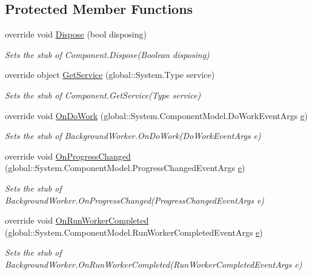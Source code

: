\subsection*{Protected Member Functions}
\begin{DoxyCompactItemize}
\item 
override void \hyperlink{class_system_1_1_component_model_1_1_fakes_1_1_stub_background_worker_a59437b38c520f4b2170ad1131b63957f}{Dispose} (bool disposing)
\begin{DoxyCompactList}\small\item\em Sets the stub of Component.\-Dispose(\-Boolean disposing)\end{DoxyCompactList}\item 
override object \hyperlink{class_system_1_1_component_model_1_1_fakes_1_1_stub_background_worker_a7fcca03bb90f1d559943e375f530c9d4}{Get\-Service} (global\-::\-System.\-Type service)
\begin{DoxyCompactList}\small\item\em Sets the stub of Component.\-Get\-Service(\-Type service)\end{DoxyCompactList}\item 
override void \hyperlink{class_system_1_1_component_model_1_1_fakes_1_1_stub_background_worker_adcdbb4b3f6e42ad2f9a6c024bc51e2e7}{On\-Do\-Work} (global\-::\-System.\-Component\-Model.\-Do\-Work\-Event\-Args \hyperlink{jquery-1_810_82_8min_8js_a2c038346d47955cbe2cb91e338edd7e1}{e})
\begin{DoxyCompactList}\small\item\em Sets the stub of Background\-Worker.\-On\-Do\-Work(\-Do\-Work\-Event\-Args e)\end{DoxyCompactList}\item 
override void \hyperlink{class_system_1_1_component_model_1_1_fakes_1_1_stub_background_worker_a302d145884dc9c3ad7978b8fdb36d070}{On\-Progress\-Changed} (global\-::\-System.\-Component\-Model.\-Progress\-Changed\-Event\-Args \hyperlink{jquery-1_810_82_8min_8js_a2c038346d47955cbe2cb91e338edd7e1}{e})
\begin{DoxyCompactList}\small\item\em Sets the stub of Background\-Worker.\-On\-Progress\-Changed(\-Progress\-Changed\-Event\-Args e)\end{DoxyCompactList}\item 
override void \hyperlink{class_system_1_1_component_model_1_1_fakes_1_1_stub_background_worker_a819c24f6d7e4db0cb2a29a11dc7a2f91}{On\-Run\-Worker\-Completed} (global\-::\-System.\-Component\-Model.\-Run\-Worker\-Completed\-Event\-Args \hyperlink{jquery-1_810_82_8min_8js_a2c038346d47955cbe2cb91e338edd7e1}{e})
\begin{DoxyCompactList}\small\item\em Sets the stub of Background\-Worker.\-On\-Run\-Worker\-Completed(\-Run\-Worker\-Completed\-Event\-Args e)\end{DoxyCompactList}\end{DoxyCompactItemize}

